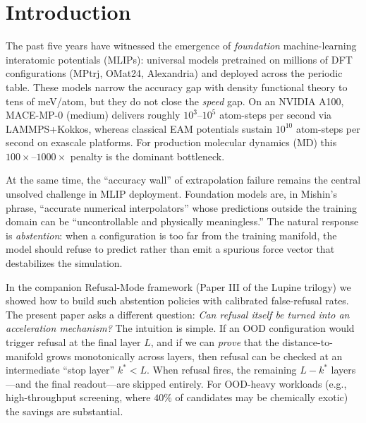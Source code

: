 \documentclass[11pt,a4paper]{article}
\begin{document}
\section{Introduction}\label{sec:intro}

The past five years have witnessed the emergence of \emph{foundation} machine-learning interatomic potentials (MLIPs): universal models pretrained on millions of DFT configurations (MPtrj, OMat24, Alexandria) and deployed across the periodic table\cite{batatia2024mace, chgnet2023, sevennet2024}. These models narrow the accuracy gap with density functional theory to tens of meV/atom, but they do not close the \emph{speed} gap. On an NVIDIA A100, MACE-MP-0 (medium) delivers roughly $10^3$--$10^5$ atom-steps per second via LAMMPS+Kokkos\cite{kovacs2024mace}, whereas classical EAM potentials sustain $10^{10}$ atom-steps per second on exascale platforms\cite{perez2023exaalt}. For production molecular dynamics (MD) this $100\times$--$1000\times$ penalty is the dominant bottleneck.

At the same time, the ``accuracy wall'' of extrapolation failure remains the central unsolved challenge in MLIP deployment\cite{mishin2021ml}. Foundation models are, in Mishin's phrase, ``accurate numerical interpolators'' whose predictions outside the training domain can be ``uncontrollable and physically meaningless.'' The natural response is \emph{abstention}: when a configuration is too far from the training manifold, the model should refuse to predict rather than emit a spurious force vector that destabilizes the simulation.

In the companion Refusal-Mode framework (Paper III of the Lupine trilogy) we showed how to build such abstention policies with calibrated false-refusal rates. The present paper asks a different question: \emph{Can refusal itself be turned into an acceleration mechanism?} The intuition is simple. If an OOD configuration would trigger refusal at the final layer $L$, and if we can \emph{prove} that the distance-to-manifold grows monotonically across layers, then refusal can be checked at an intermediate ``stop layer'' $k^* < L$. When refusal fires, the remaining $L-k^*$ layers---and the final readout---are skipped entirely. For OOD-heavy workloads (e.g., high-throughput screening, where $40\%$ of candidates may be chemically exotic) the savings are substantial.
\end{document}
